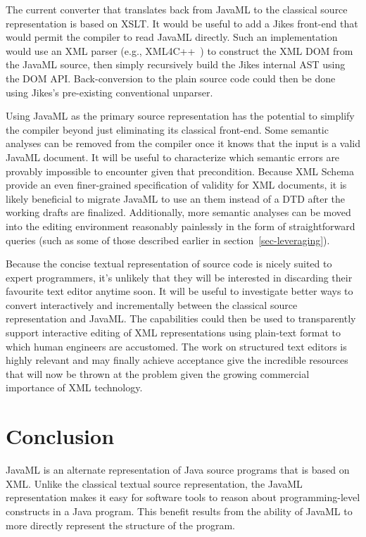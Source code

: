 \documentclass{article}
\begin{document}
\begin{multicols}{2}
The current converter that translates back from JavaML to the classical
source representation is based on XSLT.  It would be useful to add a
Jikes front-end that would permit the compiler to read JavaML directly.
Such an implementation would use an XML parser (e.g.,
XML4C++~\cite{XML4C++}) to construct the XML DOM from the JavaML source,
then simply recursively build the Jikes internal AST using the DOM API.
Back-conversion to the plain source code could then be done using
Jikes's pre-existing conventional unparser.

Using JavaML as the primary source representation has the potential to
simplify the compiler beyond just eliminating its classical front-end.
Some semantic analyses can be removed from the compiler once it knows
that the input is a valid JavaML document.  It will be useful to
characterize which semantic errors are provably impossible to encounter
given that precondition.  Because XML
Schema~\cite{XMLSchema1,XMLSchema2} provide an even finer-grained
specification of validity for XML documents, it is likely beneficial to
migrate JavaML to use an them instead of a DTD after the working drafts
are finalized.  Additionally, more semantic analyses can be moved into
the editing environment reasonably painlessly in the form of
straightforward queries (such as some of those described earlier in
section~\ref{sec-leveraging}).

Because the concise textual representation of source code is nicely
suited to expert programmers, it's unlikely that they will be interested
in discarding their favourite text editor anytime soon.  It will be
useful to investigate better ways to convert interactively and
incrementally between the classical source representation and JavaML.
The capabilities could then be used to transparently support interactive
editing of XML representations using plain-text format to which human
engineers are accustomed.  The work on structured text editors is highly
relevant and may finally achieve acceptance give the incredible
resources that will now be thrown at the problem given the growing
commercial importance of XML technology.

\section{Conclusion}
\label{sec-conclusion}

JavaML is an alternate representation of Java source programs that is
based on XML.  Unlike the classical textual source representation, the
JavaML representation makes it easy for software tools to reason about
programming-level constructs in a Java program.  This benefit results from the
ability of JavaML to more directly represent the structure of the program.


\end{multicols}
\end{document}

